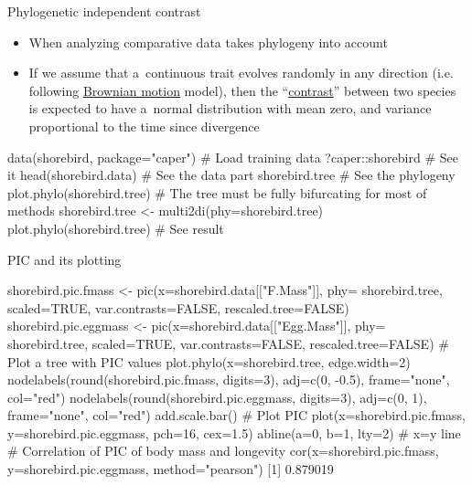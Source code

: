 \documentclass[compress, ucs, xelatex, 11pt, xcolor=svgnames, aspectratio=169,
	hyperref={
		bookmarks=true,
		unicode=true,
		colorlinks=true,
		pdftitle={Molecular data in R},
		plainpages=false,
		pdfauthor={Vojtech Zeisek},
		pdfsubject={Course about phylogeny and evolution in R},
		pdfcreator={XeLaTeX},
		pdfkeywords={R, evolution, phylogeny, molecular data},
		linkcolor=Crimson, %
		anchorcolor=Magenta, %
		citecolor=Magenta, %
		filecolor=Magenta, %
		menucolor=Magenta, %
		urlcolor=DodgerBlue, %
		pdftex},
	url={hyphens, lowtilde} %
	]{beamer}
\begin{document}
\begin{frame}[fragile]{Phylogenetic independent contrast}
	\begin{itemize}
		\item When analyzing comparative data takes phylogeny into account
		\item If we assume that a~continuous trait evolves randomly in any direction (i.e. following \href{https://en.wikipedia.org/wiki/Brownian_motion}{Brownian motion} model), then the \enquote{\href{https://en.wikipedia.org/wiki/Contrast_(statistics)}{contrast}} between two species is expected to have a~normal distribution with mean zero, and variance proportional to the time since divergence
	\end{itemize}
	\begin{spluscode}
    data(shorebird, package="caper") # Load training data
    ?caper::shorebird # See it
    head(shorebird.data) # See the data part
    shorebird.tree # See the phylogeny
    plot.phylo(shorebird.tree)
    # The tree must be fully bifurcating for most of methods
    shorebird.tree <- multi2di(phy=shorebird.tree)
    plot.phylo(shorebird.tree) # See result
	\end{spluscode}
\end{frame}

\begin{frame}[fragile]{PIC and its plotting}
	\begin{spluscode}
    shorebird.pic.fmass <- pic(x=shorebird.data[["F.Mass"]], phy=
      shorebird.tree, scaled=TRUE, var.contrasts=FALSE, rescaled.tree=FALSE)
    shorebird.pic.eggmass <- pic(x=shorebird.data[["Egg.Mass"]], phy=
      shorebird.tree, scaled=TRUE, var.contrasts=FALSE, rescaled.tree=FALSE)
    # Plot a tree with PIC values
    plot.phylo(x=shorebird.tree, edge.width=2)
    nodelabels(round(shorebird.pic.fmass, digits=3), adj=c(0, -0.5),
      frame="none", col="red")
    nodelabels(round(shorebird.pic.eggmass, digits=3), adj=c(0, 1),
      frame="none", col="red")
    add.scale.bar()
    # Plot PIC
    plot(x=shorebird.pic.fmass, y=shorebird.pic.eggmass, pch=16, cex=1.5)
    abline(a=0, b=1, lty=2) # x=y line
    # Correlation of PIC of body mass and longevity
    cor(x=shorebird.pic.fmass, y=shorebird.pic.eggmass, method="pearson")
    [1] 0.879019
	\end{spluscode}
\end{frame}
\end{document}
